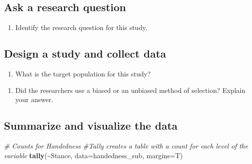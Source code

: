 \documentclass[
]{report}
\newenvironment{Shaded}{\begin{snugshade}}{\end{snugshade}}
\newcommand{\CommentTok}[1]{\textcolor[rgb]{0.56,0.35,0.01}{\textit{#1}}}
\newcommand{\DataTypeTok}[1]{\textcolor[rgb]{0.13,0.29,0.53}{#1}}
\newcommand{\KeywordTok}[1]{\textcolor[rgb]{0.13,0.29,0.53}{\textbf{#1}}}
\newcommand{\NormalTok}[1]{#1}
\newcommand{\OperatorTok}[1]{\textcolor[rgb]{0.81,0.36,0.00}{\textbf{#1}}}
\providecommand{\tightlist}{%
  \setlength{\itemsep}{0pt}\setlength{\parskip}{0pt}}
\begin{document}
\vspace{0.5in}

\hypertarget{ask-a-research-question}{%
\subsection{Ask a research question}\label{ask-a-research-question}}

\begin{enumerate}
\def\labelenumi{\arabic{enumi}.}
\setcounter{enumi}{4}
\tightlist
\item
  Identify the research question for this study.
\end{enumerate}

\vspace{1in}

\hypertarget{design-a-study-and-collect-data}{%
\subsection{Design a study and collect data}\label{design-a-study-and-collect-data}}

\begin{enumerate}
\def\labelenumi{\arabic{enumi}.}
\setcounter{enumi}{5}
\tightlist
\item
  What is the target population for this study?
\end{enumerate}

\vspace{0.5in}

\begin{enumerate}
\def\labelenumi{\arabic{enumi}.}
\setcounter{enumi}{6}
\tightlist
\item
  Did the researchers use a biased or an unbiased method of selection? Explain your answer.
\end{enumerate}

\vspace{1in}

\hypertarget{summarize-and-visualize-the-data}{%
\subsection{Summarize and visualize the data}\label{summarize-and-visualize-the-data}}

\begin{Shaded}
\begin{Highlighting}[]
\CommentTok{\# Counts for Handedness}
\CommentTok{\#Tally creates a table with a count for each level of the variable}
\KeywordTok{tally}\NormalTok{(}\OperatorTok{\textasciitilde{}}\NormalTok{Stance, }\DataTypeTok{data=}\NormalTok{handedness\_sub, }\DataTypeTok{margins=}\NormalTok{T) }
\end{Highlighting}
\end{Shaded}
\end{document}
